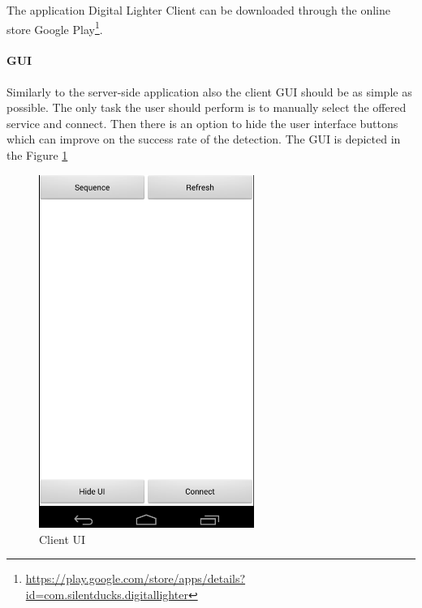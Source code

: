 The application Digital Lighter Client can be downloaded through the online store Google Play\footnote{\url{https://play.google.com/store/apps/details?id=com.silentducks.digitallighter}}.

\paragraph{GUI}
Similarly to the server-side application also the client GUI should be as simple as possible. The only task the user should perform is to manually select the offered service and connect. Then there is an option to hide the user interface buttons which can improve on the success rate of the detection. The GUI is depicted in the Figure \ref{fig:Client_UI}

\begin{figure}[H]
	\centering
		\includegraphics[width=7cm]{conclusion/user_ui.png}
	\caption{Client UI}
	\label{fig:Client_UI}
\end{figure}




